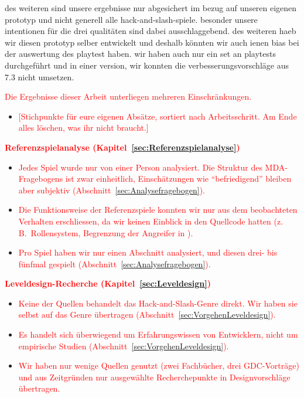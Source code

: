 \documentclass[../Main.tex]{subfiles}
\begin{document}
des weiteren sind unsere ergebnisse nur abgesichert im bezug auf unseren eigenen prototyp und nicht generell alle hack-and-slash-spiele. besonder unsere intentionen für die drei qualitäten sind dabei ausschlaggebend. des weiteren haeb wir diesen prototyp selber entwickelt und deshalb könnten wir auch ienen bias bei der auswertung des playtest haben. wir haben auch nur ein set an playtests durchgeführt und in einer version, wir konnten die verbesserungsvorschläge aus 7.3 nicht umsetzen.

\textcolor{red}{Die Ergebnisse dieser Arbeit unterliegen mehreren Einschränkungen.}

\begin{itemize}[leftmargin=1.5cm]
    \item \textcolor{red}{[Stichpunkte für eure eigenen Absätze, sortiert nach Arbeitsschritt. Am Ende alles löschen, was ihr nicht braucht.]}
\end{itemize}

\textcolor{red}{\textbf{Referenzspielanalyse (Kapitel~\ref{sec:Referenzspielanalyse})}}
\begin{itemize}[leftmargin=1.5cm]
    \item \textcolor{red}{Jedes Spiel wurde nur von einer Person analysiert. Die Struktur des MDA-Fragebogens ist zwar einheitlich, Einschätzungen wie \enquote{befriedigend} bleiben aber subjektiv (Abschnitt~\ref{sec:Analysefragebogen}).}
    \item \textcolor{red}{Die Funktionsweise der Referenzspiele konnten wir nur aus dem beobachteten Verhalten erschliessen, da wir keinen Einblick in den Quellcode hatten (z.\,B.\ Rollensystem, Begrenzung der Angreifer in ).}
    \item \textcolor{red}{Pro Spiel haben wir nur einen Abschnitt analysiert, und diesen drei- bis fünfmal gespielt (Abschnitt~\ref{sec:Analysefragebogen}).}
\end{itemize}

\textcolor{red}{\textbf{Leveldesign-Recherche (Kapitel~\ref{sec:Leveldesign})}}
\begin{itemize}[leftmargin=1.5cm]
    \item \textcolor{red}{Keine der Quellen behandelt das Hack-and-Slash-Genre direkt. Wir haben sie selbst auf das Genre übertragen (Abschnitt~\ref{sec:VorgehenLeveldesign}).}
    \item \textcolor{red}{Es handelt sich überwiegend um Erfahrungswissen von Entwicklern, nicht um empirische Studien (Abschnitt~\ref{sec:VorgehenLeveldesign}).}
    \item \textcolor{red}{Wir haben nur wenige Quellen genutzt (zwei Fachbücher, drei GDC-Vorträge) und aus Zeitgründen nur ausgewählte Recherchepunkte in Designvorschläge übertragen.}
\end{itemize}
\end{document}
